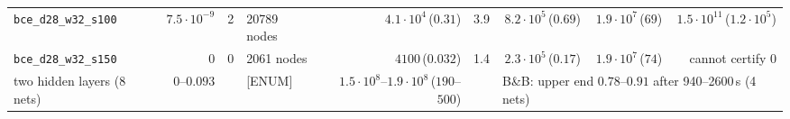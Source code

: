\begin{tabular}{lrrlrrrrr}
\texttt{bce\_d28\_w32\_s100} & $7.5\cdot10^{-9}$ & 2 & 20789 nodes & $4.1\cdot10^{4}$\,($0.31$) & 3.9 & $8.2\cdot10^{5}$\,($0.69$) & $1.9\cdot10^{7}$\,($69$) & $1.5\cdot10^{11}$\,($1.2\cdot10^{5}$)\\
\texttt{bce\_d28\_w32\_s150} & $0$ & 0 & 2061 nodes & $4100$\,($0.032$) & 1.4 & $2.3\cdot10^{5}$\,($0.17$) & $1.9\cdot10^{7}$\,($74$) & cannot certify 0\\
\midrule
two hidden layers (8 nets) & $0$--$0.093$ & & [ENUM] & $1.5\cdot10^{8}$--$1.9\cdot10^{8}$\,($190$--$500$) & & \multicolumn{3}{l}{B\&B: upper end $0.78$--$0.91$ after 940--2600\,s (4 nets)}\\
\bottomrule
\end{tabular}
